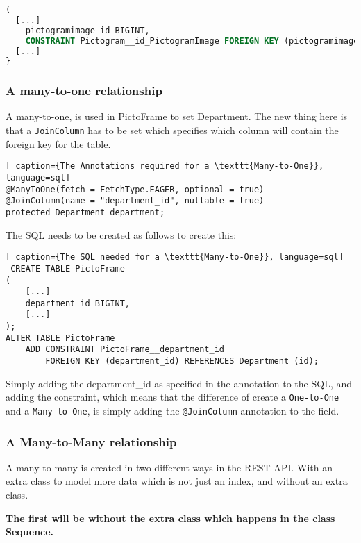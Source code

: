 \begin{lstlisting}[caption={The SQL to create the required}, language=sql]
(
  [...]
    pictogramimage_id BIGINT,
    CONSTRAINT Pictogram__id_PictogramImage FOREIGN KEY (pictogramimage_id) REFERENCES PictogramImage (id),
  [...]
}
\end{lstlisting}


\subsubsection*{A many-to-one relationship}

A many-to-one, is used in PictoFrame to set Department.
The new thing here is that a \texttt{JoinColumn} has to be set which specifies which column will contain the foreign key for the table.


\begin{lstlisting}[ caption={The Annotations required for a \texttt{Many-to-One}}, language=sql]
@ManyToOne(fetch = FetchType.EAGER, optional = true)
@JoinColumn(name = "department_id", nullable = true)
protected Department department;
\end{lstlisting}

The SQL needs to be created as follows to create this:

\begin{lstlisting}[ caption={The SQL needed for a \texttt{Many-to-One}}, language=sql]
 CREATE TABLE PictoFrame
(
    [...]
    department_id BIGINT,
    [...]
);
ALTER TABLE PictoFrame
    ADD CONSTRAINT PictoFrame__department_id
        FOREIGN KEY (department_id) REFERENCES Department (id);
\end{lstlisting}

Simply adding the department\_id as specified in the annotation to the SQL, and adding the constraint, which means that the difference of create a \texttt{One-to-One} and a \texttt{Many-to-One}, is simply adding the \texttt{@JoinColumn} annotation to the field.

\subsubsection*{A Many-to-Many relationship}

A many-to-many is created in two different ways in the REST API.
With an extra class to model more data which is not just an index, and without an extra class.

\textbf{The first will be without the extra class which happens in the class Sequence.}

